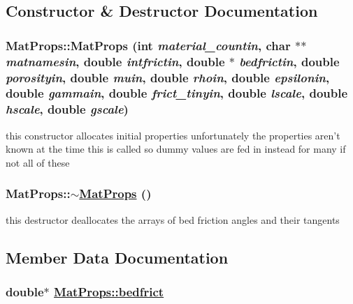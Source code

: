 \subsection{Constructor \& Destructor Documentation}
\hypertarget{structMatProps_a0}{
\subsubsection[MatProps]{\setlength{\rightskip}{0pt plus 5cm}Mat\-Props::Mat\-Props (int {\em material\_\-countin}, char $\ast$$\ast$ {\em matnamesin}, double {\em intfrictin}, double $\ast$ {\em bedfrictin}, double {\em porosityin}, double {\em muin}, double {\em rhoin}, double {\em epsilonin}, double {\em gammain}, double {\em frict\_\-tinyin}, double {\em lscale}, double {\em hscale}, double {\em gscale})}}
\label{structMatProps_a0}


this constructor allocates initial properties unfortunately the properties aren't known at the time this is called so dummy values are fed in instead for many if not all of these 

\hypertarget{structMatProps_a1}{
\subsubsection[$\sim$MatProps]{\setlength{\rightskip}{0pt plus 5cm}Mat\-Props::$\sim$\hyperlink{structMatProps}{Mat\-Props} ()}}
\label{structMatProps_a1}


this destructor deallocates the arrays of bed friction angles and their tangents 



\subsection{Member Data Documentation}
\hypertarget{structMatProps_o6}{
\subsubsection[bedfrict]{\setlength{\rightskip}{0pt plus 5cm}double$\ast$ \hyperlink{structMatProps_o6}{Mat\-Props::bedfrict}}}
\label{structMatProps_o6}


